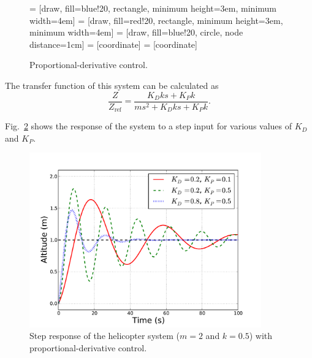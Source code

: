 \documentclass[a4paper,11pt]{report}
\theoremstyle{definition}
\newcommand{\re}{\mathrm{ref}}
\begin{document}
\begin{figure}[H]
  \label{fig:examplesystempd}
  \centering
   = [draw, fill=blue!20, rectangle, minimum height=3em, minimum width=4em]
   = [draw, fill=red!20, rectangle, minimum height=3em, minimum width=4em]
   = [draw, fill=blue!20, circle, node distance=1cm]
   = [coordinate]
   = [coordinate]
  \caption{Proportional-derivative control.}
\end{figure}

The transfer function of this system can be calculated as
\[
\frac{Z}{Z_\re} = \frac{K_Dk s+ K_Pk}{ms^2+K_Dks+K_Pk}.
\]

Fig.~\ref{fig:steprespd} shows the response of the system to a step
input for various values of $K_D$ and $K_P$.

\begin{figure}[H]
  \centering
  \includegraphics[width=10cm]{fig/steprespd.pdf}
  \caption{Step response of the helicopter system ($m=2$ and $k=0.5$)
    with proportional-derivative control.}
  \label{fig:steprespd}
\end{figure}
\end{document}
